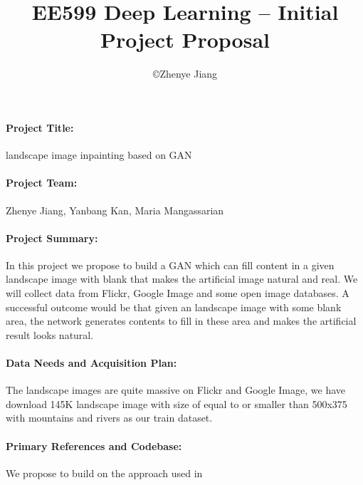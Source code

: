 \documentclass[11pt]{article}
\title{\bf EE599 Deep Learning -- Initial Project Proposal}
\author{\copyright  Zhenye Jiang}
\begin{document}
\maketitle

\paragraph{Project Title:}  landscape image inpainting based on GAN

\paragraph{Project Team:} Zhenye Jiang, Yanbang Kan, Maria Mangassarian

\paragraph{Project Summary:}   In this project we propose to build a GAN which can fill content in a given landscape image with blank that makes the artificial image natural and real. We will collect data from Flickr, Google Image and some open image databases. A successful outcome would be that given an landscape image with some blank area, the network generates contents to fill in these area and makes the artificial result looks natural. 

\paragraph{Data Needs and Acquisition Plan:}  The landscape images are quite massive on Flickr and Google Image, we have download 145K landscape image with size of equal to or smaller than 500x375 with mountains and rivers as our train dataset. 


\paragraph{Primary References and Codebase:}  We propose to build on the approach used in 
\end{document}
